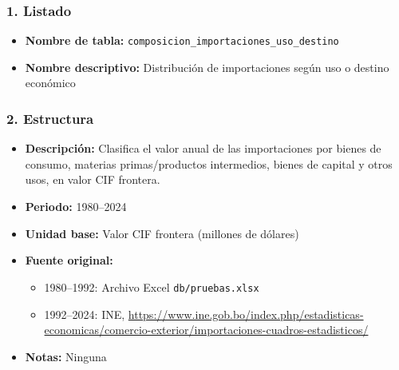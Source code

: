 \documentclass[12pt,a4paper]{article}
\begin{document}
\subsubsection*{1. Listado}
\begin{itemize}
  \item \textbf{Nombre de tabla:} \texttt{composicion\_importaciones\_uso\_destino}
  \item \textbf{Nombre descriptivo:} Distribución de importaciones según uso o destino económico
\end{itemize}

\subsubsection*{2. Estructura}
\begin{itemize}
  \item \textbf{Descripción:} Clasifica el valor anual de las importaciones por bienes de consumo, materias primas/productos intermedios, bienes de capital y otros usos, en valor CIF frontera.
  \item \textbf{Periodo:} 1980--2024
  \item \textbf{Unidad base:} Valor CIF frontera (millones de dólares)
  \item \textbf{Fuente original:}
    \begin{itemize}
      \item 1980--1992: Archivo Excel \texttt{db/pruebas.xlsx}
      \item 1992--2024: INE, \url{https://www.ine.gob.bo/index.php/estadisticas-economicas/comercio-exterior/importaciones-cuadros-estadisticos/}
    \end{itemize}
  \item \textbf{Notas:} Ninguna
\end{itemize}
\end{document}
